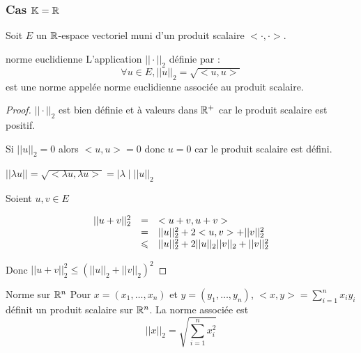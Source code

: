 \subsubsection{Cas \texorpdfstring{$\mathbb{K} = \mathbb{R}$}{K = R}}


Soit $E$ un $\mathbb{R}$-espace vectoriel muni d'un produit scalaire $< \cdot , \cdot >$.


\begin{theoreme}{norme euclidienne}{}
    L'application $|| \cdot ||_2$ définie par : 
    $$ \forall u \in E, ||u||_2 = \sqrt{<u, u>}$$
    est une norme appelée norme euclidienne associée au produit scalaire. 
\end{theoreme}


\begin{proof}
    $|| \cdot ||_2$ est bien définie et à valeurs dans $\mathbb{R}^+$ car le produit scalaire est positif. 


    \svspace Si $||u||_2 = 0 $ alors $<u, u> = 0$ donc $u = 0$ car le produit scalaire est 
    défini. 


    \svspace $||\lambda u|| = \sqrt{<\lambda u, \lambda u>} = \mid \lambda \mid ||u||_2$


    \svspace Soient $u, v \in E$

    \[
    \begin{array}{rcl}
        ||u + v ||^2_2 & = & <u + v , u + v> \\
        \space & = & ||u||_2^2 + 2 <u, v> + ||v||_2^2 \\
        \space & \leqslant & ||u||_2^2 + 2 ||u||_2||v||_2 + ||v||_2^2 \\
    \end{array}
    \]

    Donc $||u + v||_2^2 \leqslant (||u||_2 + ||v||_2)^2$
\end{proof}

\begin{definition}{Norme sur $\mathbb{R}^n$}{}
    Pour $x = (x_1, \dots, x_n)$ et $y = (y_1, \dots, y_n)$, $\displaystyle <x, y> = \sum_{i = 1 }^{n }x_i y_i$ définit un 
    produit scalaire sur $\mathbb{R}^n$. La norme associée est 
    $$ ||x||_2 = \sqrt{\sum_{i = 1 }^{n }x_i^2}$$
\end{definition}


